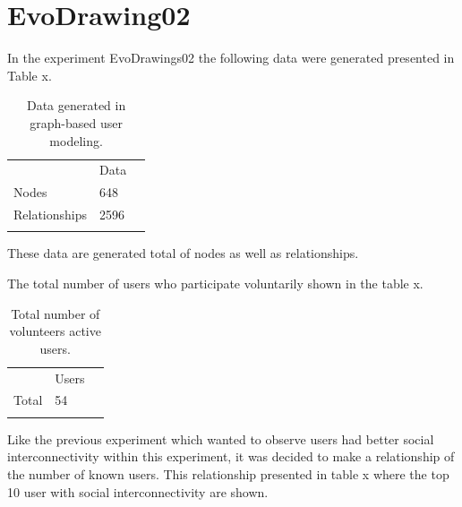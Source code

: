 \section {EvoDrawing02}


In the experiment EvoDrawings02 the following data were generated presented in Table x.


\begin{table}
\small
\caption{Data generated in graph-based user modeling.}
\label{tab:dataGenerated_2} 
\centering
\small
\begin{tabular}{p{3cm} p{3cm} p{3cm} }
\hline\noalign{\smallskip}
  & Data &  \\
\noalign{\smallskip}\hline\noalign{\smallskip}
\small{Nodes} & \small{648} & \\ \hline  
\small{Relationships} & \small{2596} & \\ \hline  
  
\noalign{\smallskip}\hline
\end{tabular}
\end{table}

These data are generated total of nodes as well as relationships.

The total number of users who participate voluntarily shown in the table x.

\begin{table}
\small
\caption{Total number of volunteers active users.}
\label{tab:totalUsers_1} 
\centering
\small
\begin{tabular}{p{3cm} p{3cm} p{3cm} }
\hline\noalign{\smallskip}
  & Users &  \\
\noalign{\smallskip}\hline\noalign{\smallskip}
\small{Total } & \small{54} & \\ \hline    
\noalign{\smallskip}\hline
\end{tabular}
\end{table}

Like the previous experiment which wanted to observe users had better social
interconnectivity within this experiment, it was decided to make a relationship
of the number of known users. This relationship presented in table x where the
top 10 user  with social interconnectivity are shown.


